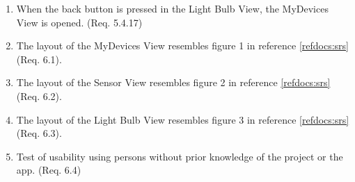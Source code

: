 \documentclass[a4paper]{article}
\newlength{\testlabellength}
\newenvironment{testlist}{\begin{enumerate}[label=\bfseries Test \thesubsection.\arabic* , labelindent=0pt, labelwidth=\testlabellength , leftmargin=2cm]}{\end{enumerate}}
\begin{document}
\begin{appendices}
\begin{testlist}
	\item When the back button is pressed in the Light Bulb View, the MyDevices View is opened. (Req. 5.4.17)
	
	\item The layout of the MyDevices View resembles figure 1 in reference \ref{refdocs:srs} (Req. 6.1).
	
	\item The layout of the Sensor View resembles figure 2 in reference \ref{refdocs:srs} (Req. 6.2).
	
	\item The layout of the Light Bulb View resembles figure 3 in reference \ref{refdocs:srs} (Req. 6.3).
	
	\item Test of usability using persons without prior knowledge of the project or the app. (Req. 6.4)
\end{testlist}

\end{appendices}
\end{document}
